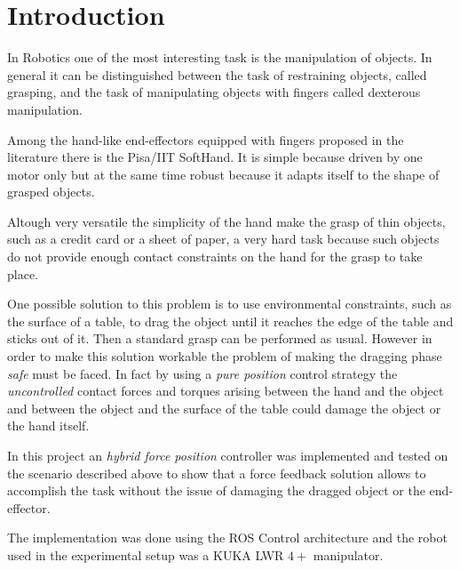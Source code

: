 \section*{Introduction}
In Robotics one of the most interesting task is the manipulation of objects. In general
it can be distinguished between the task of restraining objects, called grasping,
and the task of manipulating objects with fingers called dexterous manipulation.
\par
Among the hand-like end-effectors equipped with fingers proposed in the literature
there is the Pisa/IIT SoftHand. It is simple because driven by one motor only
but at the same time robust because it adapts itself to the shape of grasped objects.
\par
Altough very versatile the simplicity of the hand make the grasp of thin objects,
such as a credit card or a sheet of paper, a very hard task
because such objects do not provide enough contact constraints on the hand
for the grasp to take place.
\par
One possible solution to this problem is to use environmental constraints, such as
the surface of a table, to drag the object until it reaches the edge of the table and
sticks out of it. Then a standard grasp can be performed as usual. However in order to make
this solution workable the problem of making the dragging phase \emph{safe} must be faced.
In fact by using a \emph{pure position} control strategy the \emph{uncontrolled} contact forces and torques
arising between the hand and the object and between the object and the surface of the table
could damage the object or the hand itself.
\par
In this project an \emph{hybrid force position} controller was implemented and tested on the
scenario described above to show that a force feedback solution allows to accomplish the task
without the issue of damaging the dragged object or the end-effector.
\par
The implementation was done using the ROS Control architecture and the robot used
in the experimental setup was a KUKA LWR $4+$ manipulator.

